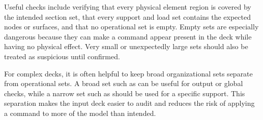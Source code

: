 Useful checks include verifying that every physical element region is covered by the intended section set, that every support and load set contains the expected nodes or surfaces, and that no operational set is empty. Empty sets are especially dangerous because they can make a command appear present in the deck while having no physical effect. Very small or unexpectedly large sets should also be treated as suspicious until confirmed.

For complex decks, it is often helpful to keep broad organizational sets separate from operational sets. A broad set such as  can be useful for output or global checks, while a narrow set such as  should be used for a specific support. This separation makes the input deck easier to audit and reduces the risk of applying a command to more of the model than intended.
